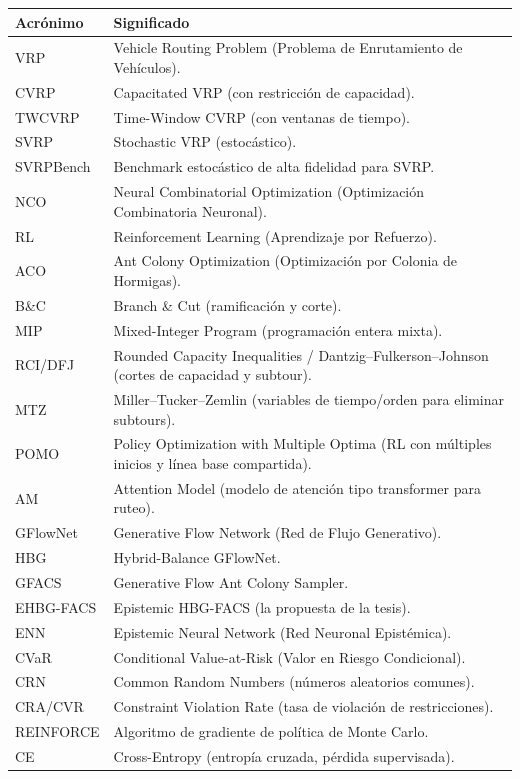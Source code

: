 \documentclass[11pt,a4paper]{article}
\begin{document}
\begin{longtable}{p{2.6cm}p{12.5cm}}
  \toprule
  \textbf{Acrónimo} & \textbf{Significado}\\
  \midrule
  \endhead
  VRP & Vehicle Routing Problem (Problema de Enrutamiento de Vehículos).\\
  CVRP & Capacitated VRP (con restricción de capacidad).\\
  TWCVRP & Time-Window CVRP (con ventanas de tiempo).\\
  SVRP & Stochastic VRP (estocástico).\\
  SVRPBench & Benchmark estocástico de alta fidelidad para SVRP.\\
  NCO & Neural Combinatorial Optimization (Optimización Combinatoria Neuronal).\\
  RL & Reinforcement Learning (Aprendizaje por Refuerzo).\\
  ACO & Ant Colony Optimization (Optimización por Colonia de Hormigas).\\
  B\&C & Branch \& Cut (ramificación y corte).\\
  MIP & Mixed-Integer Program (programación entera mixta).\\
  RCI/DFJ & Rounded Capacity Inequalities / Dantzig--Fulkerson--Johnson (cortes de capacidad y subtour).\\
  MTZ & Miller--Tucker--Zemlin (variables de tiempo/orden para eliminar subtours).\\
  POMO & Policy Optimization with Multiple Optima (RL con múltiples inicios y línea base compartida).\\
  AM & Attention Model (modelo de atención tipo transformer para ruteo).\\
  GFlowNet & Generative Flow Network (Red de Flujo Generativo).\\
  HBG & Hybrid-Balance GFlowNet.\\
  GFACS & Generative Flow Ant Colony Sampler.\\
  EHBG-FACS & Epistemic HBG-FACS (la propuesta de la tesis).\\
  ENN & Epistemic Neural Network (Red Neuronal Epistémica).\\
  CVaR & Conditional Value-at-Risk (Valor en Riesgo Condicional).\\
  CRN & Common Random Numbers (números aleatorios comunes).\\
  CRA/CVR & Constraint Violation Rate (tasa de violación de restricciones).\\
  REINFORCE & Algoritmo de gradiente de política de Monte Carlo.\\
  CE & Cross-Entropy (entropía cruzada, pérdida supervisada).\\
  \bottomrule
\end{longtable}
\end{document}
